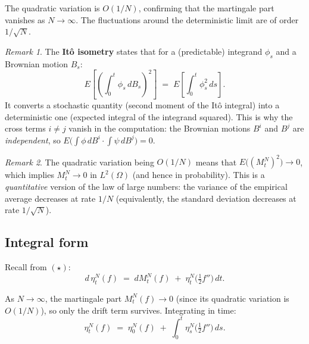 \documentclass[11pt]{article}
\theoremstyle{definition}
\theoremstyle{remark}
\newtheorem{remark}{Remark}
\begin{document}

The quadratic variation is $O(1/N)$, confirming that
the martingale part vanishes as $N \to \infty$.
The fluctuations around the deterministic limit
are of order $1/\sqrt{N}$.

\begin{remark}
The \textbf{It\^o isometry} states that for a (predictable)
integrand $\phi_s$ and a Brownian motion $B_s$:
\[
    E\!\left[\left(\int_0^t \phi_s\,dB_s\right)^{\!2}\right]
    \;=\;
    E\!\left[\int_0^t \phi_s^2\,ds\right].
\]
It converts a stochastic quantity (second moment of the It\^o
integral) into a deterministic one (expected integral of the
integrand squared).  This is why the cross terms
$i \neq j$ vanish in the computation: the Brownian motions
$B^i$ and $B^j$ are \emph{independent}, so
$E\!\bigl(\int \phi\,dB^i \cdot \int \psi\,dB^j\bigr) = 0$.
\end{remark}

\begin{remark}
The quadratic variation being $O(1/N)$ means that
$E\!\bigl((M_t^N)^2\bigr) \to 0$, which implies
$M_t^N \to 0$ in $L^2(\Omega)$ (and hence in probability).
This is a \emph{quantitative} version of the law of large numbers:
the variance of the empirical average decreases at rate $1/N$
(equivalently, the standard deviation decreases at rate $1/\sqrt{N}$).
\end{remark}

\subsection*{Integral form}


Recall from $(\star)$:
\[
    d\,\eta_t^N(f)
    \;=\;
    dM_t^N(f)
    \;+\;
    \eta_t^N\!\bigl(\tfrac{1}{2}f''\bigr)\,dt.
\]

As $N \to \infty$, the martingale part $M_t^N(f) \to 0$
(since its quadratic variation is $O(1/N)$),
so only the drift term survives.
Integrating in time:
\[
    \eta_t^N(f)
    \;=\;
    \eta_0^N(f)
    \;+\;
    \int_0^t \eta_s^N\!\bigl(\tfrac{1}{2}f''\bigr)\,ds.
\]
\end{document}
